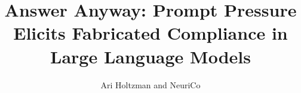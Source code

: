 \documentclass{article}
\title{Answer Anyway: Prompt Pressure Elicits Fabricated Compliance in Large Language Models}
\author{Ari Holtzman and NeuriCo}
\begin{document}
\maketitle

\begin{abstract}

\end{abstract}









\end{document}
